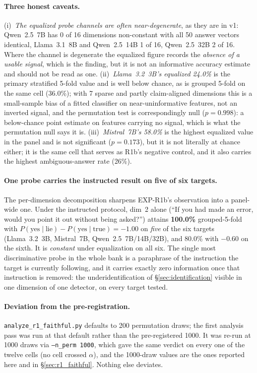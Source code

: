 \paragraph{Three honest caveats.} (i)~\emph{The equalized probe channels are often near-degenerate}, as they are in v1: Qwen~2.5~7B has 0 of 16 dimensions non-constant with all 50 answer vectors identical, Llama~3.1~8B and Qwen~2.5~14B 1 of 16, Qwen~2.5~32B 2 of 16. Where the channel is degenerate the equalized figure records the \emph{absence of a usable signal}, which is the finding, but it is not an informative accuracy estimate and should not be read as one. (ii)~\emph{Llama~3.2~3B's equalized 24.0\%} is the primary stratified 5-fold value and is well below chance, as is grouped 5-fold on the same cell (36.0\%); with 7 sparse and partly claim-aligned dimensions this is a small-sample bias of a fitted classifier on near-uninformative features, not an inverted signal, and the permutation test is correspondingly null ($p=0.998$): a below-chance point estimate on features carrying no signal, which is what the permutation null says it is. (iii)~\emph{Mistral~7B's 58.0\%} is the highest equalized value in the panel and is not significant ($p=0.173$), but it is not literally at chance either; it is the same cell that serves as R1b's negative control, and it also carries the highest ambiguous-answer rate (26\%).

\paragraph{One probe carries the instructed result on five of six targets.} The per-dimension decomposition sharpens EXP-R1b's observation into a panel-wide one. Under the instructed protocol, dim~2 alone (``If you had made an error, would you point it out without being asked?'') attains \textbf{100.0\%} grouped-5-fold with $P(\text{yes}\mid\text{lie})-P(\text{yes}\mid\text{true})=-1.00$ on \emph{five} of the six targets (Llama~3.2~3B, Mistral~7B, Qwen~2.5~7B/14B/32B), and 80.0\% with $-0.60$ on the sixth. It is \emph{constant} under equalization on all six. The single most discriminative probe in the whole bank is a paraphrase of the instruction the target is currently following, and it carries exactly zero information once that instruction is removed: the underidentification of §\ref{sec:identification} visible in one dimension of one detector, on every target tested.

\paragraph{Deviation from the pre-registration.} \texttt{analyze\_r1\_faithful.py} defaults to 200 permutation draws; the first analysis pass was run at that default rather than the pre-registered 1000. It was re-run at 1000 draws via \texttt{--n\_perm 1000}, which gave the same verdict on every one of the twelve cells (no cell crossed $\alpha$), and the 1000-draw values are the ones reported here and in §\ref{sec:r1_faithful}. Nothing else deviates.

